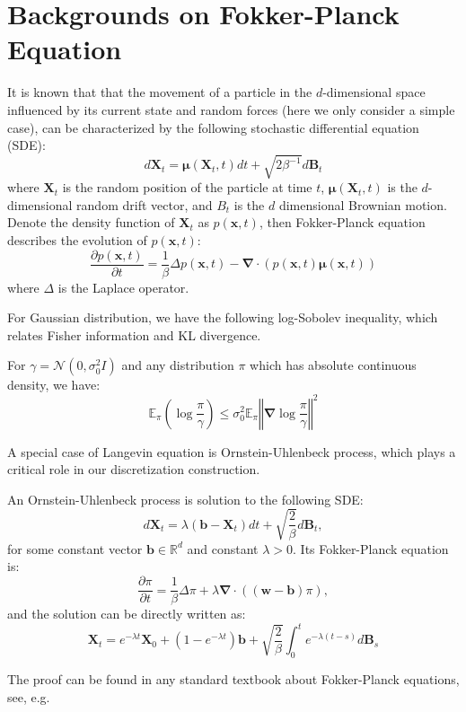\documentclass[final,12pt]{colt2018} %
\newcommand{\x}{\bm{x}}
\newcommand{\X}{\bm{X}}
\newcommand{\B}{\bm{B}}
\begin{document}
\section{Backgrounds on Fokker-Planck Equation}\label{Background-fokker-planck}

It is known that that the movement of a particle in the $d$-dimensional space influenced by its current state and random forces (here we only consider a simple case), can be characterized by the following stochastic differential equation (SDE):
\begin{equation}
 d\X_t = \bm{\mu}(\X_t, t)dt + \sqrt{2 \beta^{-1}} d\B_t
\end{equation}
where $\X_t$ is the random position of the particle at time $t$, $\bm{\mu}(\X_t, t)$ is the $d$-dimensional random drift vector, and $B_t$ is the $d$ dimensional Brownian motion. Denote the density function of $\X_t$ as $p(\x,t)$, then Fokker-Planck equation describes the evolution of $p(\x,t)$:
\begin{equation}
 \frac{\partial p(\x,t)}{\partial t} = \frac{1}{\beta}\Delta p(\x, t) - \bm{\nabla}\cdot(p(\x,t)\bm{\mu}(\x, t))
\end{equation}
where $\Delta$ is the Laplace operator.

For Gaussian distribution, we have the following log-Sobolev inequality, which relates Fisher information and KL divergence.
\begin{theorem}
	For $\gamma=\mathcal{N}(0,\sigma_0^2I)$ and any distribution $\pi$ which has absolute continuous density, we have:
	\begin{equation}
		\mathbb{E}_{\pi}\left(\log \frac{\pi}{\gamma}\right)\leq \sigma_0^2 \mathbb{E}_{\pi}\left\Vert\bm{\nabla} \log \frac{\pi}{\gamma}\right\Vert^2
	\end{equation}
\end{theorem}

A special case of Langevin equation is Ornstein-Uhlenbeck process, which plays a critical role in our discretization construction.
\begin{proposition}\label{ornstein-uhlenbeck}
	An Ornstein-Uhlenbeck process is solution to the following SDE:
	\begin{equation}
		d\bm{X}_t=\lambda(\bm{b}-\bm{X}_t)dt+\sqrt{\frac{2}{\beta}}d\bm{B}_t,
	\end{equation}
	for some constant vector $\bm{b}\in \mathbb{R}^d$ and constant $\lambda>0$.
	Its Fokker-Planck equation is:
	\begin{equation}
\frac{\partial\pi}{\partial t}=\frac{1}{\beta}\Delta \pi+\lambda\bm{\nabla}\cdot\left((\bm{w}-\bm{b})\pi\right),
\end{equation}
and the solution can be directly written as:
\begin{equation}
	\bm{X}_t=e^{-\lambda t}\bm{X}_0+\left(1-e^{-\lambda t}\right)\bm{b}+\sqrt{\frac{2}{\beta}}\int_{0}^t e^{-\lambda(t-s)}d\bm{B}_s
\end{equation}
\end{proposition}
The proof can be found in any standard textbook about Fokker-Planck equations, see, e.g.~\citep{risken1996fokker}
\end{document}
